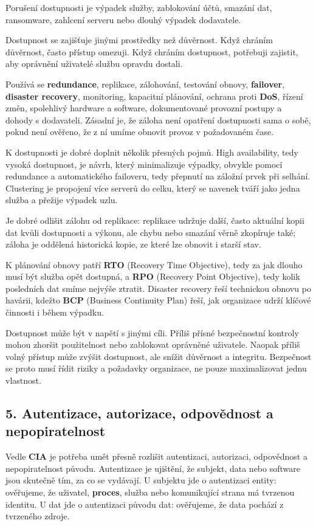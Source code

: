 \documentclass[11pt,a4paper]{article}
\begin{document}
Porušení dostupnosti je výpadek služby, zablokování účtů, smazání dat, ransomware, zahlcení serveru nebo dlouhý výpadek dodavatele.

Dostupnost se zajišťuje jinými prostředky než důvěrnost. Když chráním důvěrnost, často přístup omezuji. Když chráním dostupnost, potřebuji zajistit, aby oprávnění uživatelé službu opravdu dostali.

Používá se \textbf{redundance}, replikace, zálohování, testování obnovy, \textbf{failover}, \textbf{disaster recovery}, monitoring, kapacitní plánování, ochrana proti \textbf{DoS}, řízení změn, spolehlivý hardware a software, dokumentované provozní postupy a dohody s dodavateli. Zásadní je, že záloha není opatření dostupnosti sama o sobě, pokud není ověřeno, že z ní umíme obnovit provoz v požadovaném čase.

K dostupnosti je dobré doplnit několik přesných pojmů. High availability, tedy vysoká dostupnost, je návrh, který minimalizuje výpadky, obvykle pomocí redundance a automatického failoveru, tedy přepnutí na záložní prvek při selhání. Clustering je propojení více serverů do celku, který se navenek tváří jako jedna služba a přežije výpadek uzlu.

Je dobré odlišit zálohu od replikace: replikace udržuje další, často aktuální kopii dat kvůli dostupnosti a výkonu, ale chybu nebo smazání věrně zkopíruje také; záloha je oddělená historická kopie, ze které lze obnovit i starší stav.

K plánování obnovy patří \textbf{RTO} (Recovery Time Objective), tedy za jak dlouho musí být služba opět dostupná, a \textbf{RPO} (Recovery Point Objective), tedy kolik posledních dat smíme nejvýše ztratit. Disaster recovery řeší technickou obnovu po havárii, kdežto \textbf{BCP} (Business Continuity Plan) řeší, jak organizace udrží klíčové činnosti i během výpadku.

Dostupnost může být v napětí s jinými cíli. Příliš přísné bezpečnostní kontroly mohou zhoršit použitelnost nebo zablokovat oprávněné uživatele. Naopak příliš volný přístup může zvýšit dostupnost, ale snížit důvěrnost a integritu. Bezpečnost se proto musí řídit riziky a požadavky organizace, ne pouze maximalizovat jednu vlastnost.

\subsection*{5. Autentizace, autorizace, odpovědnost a nepopiratelnost}

Vedle \textbf{CIA} je potřeba umět přesně rozlišit autentizaci, autorizaci, odpovědnost a nepopiratelnost původu. Autentizace je ujištění, že subjekt, data nebo software jsou skutečně tím, za co se vydávají. U subjektu jde o autentizaci entity: ověřujeme, že uživatel, \textbf{proces}, služba nebo komunikující strana má tvrzenou identitu. U dat jde o autentizaci původu dat: ověřujeme, že data pochází z tvrzeného zdroje.
\end{document}
